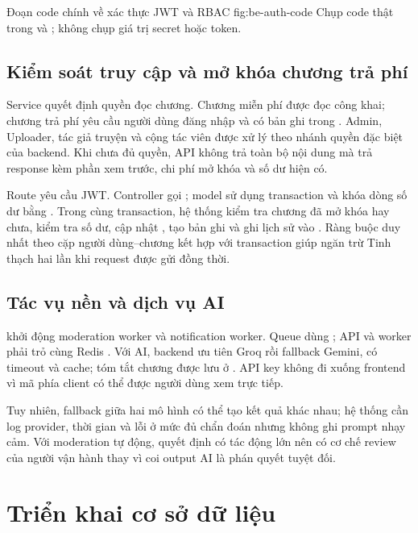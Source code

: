   {Đoạn code chính về xác thực JWT và RBAC}
  {fig:be-auth-code}
  {Chụp code thật trong  và ; không chụp giá trị secret hoặc token.}
\subsection{Kiểm soát truy cập và mở khóa chương trả phí}

Service  quyết định quyền đọc chương. Chương miễn phí được đọc công khai; chương trả phí yêu cầu người dùng đăng nhập và có bản ghi trong . Admin, Uploader, tác giả truyện và cộng tác viên được xử lý theo nhánh quyền đặc biệt của backend. Khi chưa đủ quyền, API không trả toàn bộ nội dung mà trả response  kèm phần xem trước, chi phí mở khóa và số dư hiện có.

Route  yêu cầu JWT. Controller gọi ; model sử dụng transaction  và khóa dòng số dư bằng . Trong cùng transaction, hệ thống kiểm tra chương đã mở khóa hay chưa, kiểm tra số dư, cập nhật , tạo bản ghi  và ghi lịch sử vào . Ràng buộc duy nhất theo cặp người dùng--chương kết hợp với transaction giúp ngăn trừ Tinh thạch hai lần khi request được gửi đồng thời.
\subsection{Tác vụ nền và dịch vụ AI}

 khởi động moderation worker và notification worker. Queue dùng ; API và worker phải trỏ cùng Redis \cite{redis-docs,bullmq-docs}. Với AI, backend ưu tiên Groq rồi fallback Gemini, có timeout và cache; tóm tắt chương được lưu ở . API key không đi xuống frontend vì mã phía client có thể được người dùng xem trực tiếp.

Tuy nhiên, fallback giữa hai mô hình có thể tạo kết quả khác nhau; hệ thống cần log provider, thời gian và lỗi ở mức đủ chẩn đoán nhưng không ghi prompt nhạy cảm. Với moderation tự động, quyết định có tác động lớn nên có cơ chế review của người vận hành thay vì coi output AI là phán quyết tuyệt đối.

\section{Triển khai cơ sở dữ liệu}

